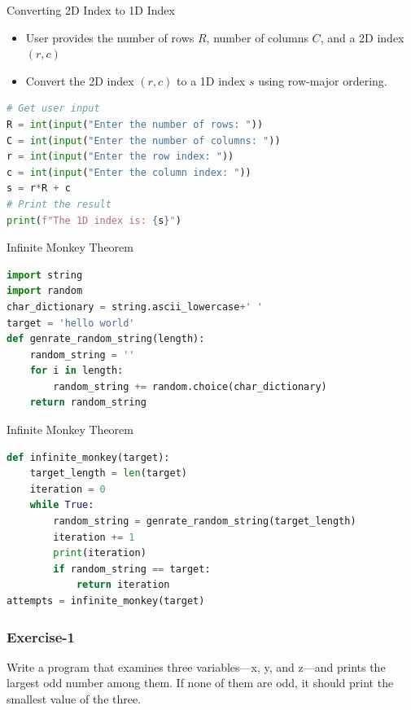\begin{frame}[fragile]{Converting 2D Index to 1D Index}
    \begin{itemize}
        \item User provides the number of rows \(R\), number of columns \(C\), and a 2D index \((r, c)\)
        \item Convert the 2D index \((r, c)\) to a 1D index \(s\) using row-major ordering.
    \end{itemize}
    \begin{lstlisting}[language=Python]
# Get user input
R = int(input("Enter the number of rows: "))
C = int(input("Enter the number of columns: "))
r = int(input("Enter the row index: "))
c = int(input("Enter the column index: "))
s = r*R + c
# Print the result
print(f"The 1D index is: {s}")
    \end{lstlisting}
\end{frame}

\begin{frame}[fragile]{Infinite Monkey Theorem}
 \begin{lstlisting}[language=Python]
import string 
import random 
char_dictionary = string.ascii_lowercase+' '
target = 'hello world'
def genrate_random_string(length):
    random_string = ''
    for i in length:
        random_string += random.choice(char_dictionary)
    return random_string
\end{lstlisting}
\end{frame}

\begin{frame}[fragile]{Infinite Monkey Theorem}
 \begin{lstlisting}[language=Python]
def infinite_monkey(target):
    target_length = len(target)
    iteration = 0
    while True:
        random_string = genrate_random_string(target_length)
        iteration += 1
        print(iteration)
        if random_string == target:
            return iteration
attempts = infinite_monkey(target)
\end{lstlisting}
\end{frame}

\begin{frame}
    \frametitle{Exercise-1}
    Write a program that examines three variables—x, y, and z—and prints the largest odd number among them. If none
    of them are odd, it should print the smallest value of the three.
\end{frame}

